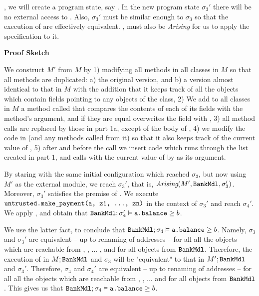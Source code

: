 , we will   create 
a program state, say . In the new program state $\sigma_3'$ there will be no external access to . 
Also, $\sigma_3'$  must be similar enough to 
$\sigma_3$ so  that the execution of  
 are  effectively equivalent.   , must also be \textit{Arising} for us to apply the \Nec specification 
\SrobustB to it. 

\vspace{.1in}

\noindent
{\bf{Proof Sketch}}

\noindent
We construct $M'$ from $M$ by 1) modifying  all methods in all 
classes in $M$  so that all methods are duplicated: a) the original version, and b) 
a version almost identical  to that in $M$ with the addition that it keeps track of all the objects which contain fields pointing to
any objects of the  class, 
2) We add to all classes in $M$ a method called 
that compares the contents of each of its fields with the method's argument, and if they are
equal overwrites the field with , 
3) all method calls  are replaced by those in part 1a, except of the body of ,
4) we modify the code in  (and any methods called from it) so that it also keeps track of the current value of
, 
5) after  and before the call  we insert  code which
runs through the list created in part 1, and calls  with the current value of  by  as its argument.

By staring with the same initial configuration which reached $\sigma_3$,
 but now using $M'$ as the external module, we reach $\sigma_3'$, 
that is, $\textit{Arising}(M', {\texttt{BankMdl}}, \sigma_3')$. Moreover,  $\sigma_3'$ 
satisfies the premise of  \SrobustB. 
We execute${\texttt{untrusted}}{\texttt{.make\_payment}}{\texttt{(a, z1, ..., zn)}}$ in the context of   $\sigma_3'$ 
and reach $\sigma_4'$. We apply  \SrobustB, and obtain that ${\texttt{BankMdl}};\sigma_4' \vDash {\texttt{a.balance}} \geq b$.

We use the latter fact, to conclude that ${\texttt{BankMdl}};\sigma_4 \vDash {\texttt{a.balance}} \geq b$.
Namely, $\sigma_3$ and $\sigma_3'$ are equivalent -- up to renaming of addresses  -- for all all the objects which are
reachable from , , ... , and for all objects from 
${\texttt{BankMdl}}$. Therefore, the execution of  in $M;{\texttt{BankMdl}}$ and $\sigma_3$
will be "equivalent" to that in $M';{\texttt{BankMdl}}$ and $\sigma_3'$. Therefore, $\sigma_4$ and $\sigma_4'$ are equivalent -- up to renaming of addresses  -- for all all the objects which are
reachable from , , ...  and for all objects from 
${\texttt{BankMdl}}$.
This gives us that  ${\texttt{BankMdl}};\sigma_4 \vDash {\texttt{a.balance}} \geq b$.


